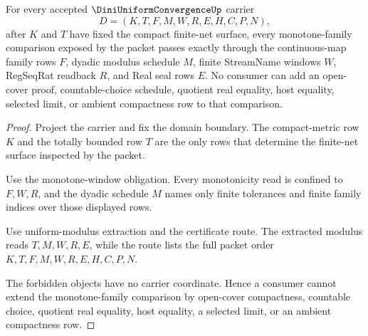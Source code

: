\begin{theorem}
\label{thm:diniuniformconvergence-monotone-family-exhaustion}
For every accepted $\DiniUniformConvergenceUp$ carrier
$$
D=(K,T,F,M,W,R,E,H,C,P,N),
$$
after $K$ and $T$ have fixed the compact finite-net surface, every monotone-family comparison exposed by the packet passes exactly through the continuous-map family rows $F$, dyadic modulus schedule $M$, finite StreamName windows $W$, RegSeqRat readback $R$, and Real seal rows $E$. No consumer can add an open-cover proof, countable-choice schedule, quotient real equality, host equality, selected limit, or ambient compactness row to that comparison.
\end{theorem}
\begin{proof}
Project the carrier and fix the domain boundary. The compact-metric row $K$ and the totally bounded row $T$ are the only rows that determine the finite-net surface inspected by the packet.

Use the monotone-window obligation. Every monotonicity read is confined to $F,W,R$, and the dyadic schedule $M$ names only finite tolerances and finite family indices over those displayed rows.

Use uniform-modulus extraction and the certificate route. The extracted modulus reads $T,M,W,R,E$, while the route lists the full packet order $K,T,F,M,W,R,E,H,C,P,N$.

The forbidden objects have no carrier coordinate. Hence a consumer cannot extend the monotone-family comparison by open-cover compactness, countable choice, quotient real equality, host equality, a selected limit, or an ambient compactness row.
\end{proof}

